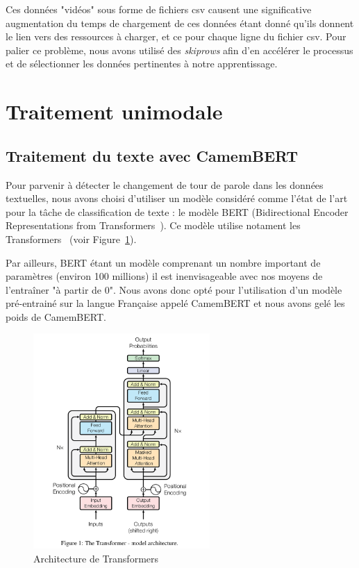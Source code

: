 \documentclass[a4paper]{article}
\begin{document}
Ces données "vidéos" sous forme de fichiers csv causent une significative augmentation du temps de chargement de ces données étant
donné qu'ils donnent le lien vers des ressources à charger, et ce pour chaque ligne du fichier csv. 
Pour palier ce problème, nous avons utilisé des \textit{skiprows} afin d'en accélérer le processus et de sélectionner les données
pertinentes à notre apprentissage.

\section{Traitement unimodale}

\subsection{Traitement du texte avec CamemBERT}

Pour parvenir à détecter le changement de tour de parole dans les données textuelles, nous avons choisi d'utiliser un modèle
considéré comme l'état de l'art pour la tâche de classification de texte : le modèle BERT (Bidirectional Encoder
Representations from Transformers~\cite{Bert}). Ce modèle utilise notament les Transformers~\cite{transformers} (voir Figure~\ref{fig: Transformers}).

Par ailleurs, BERT étant un modèle comprenant un nombre important de paramètres (environ 100 millions) il est inenvisageable avec
nos moyens de l'entraîner "à partir de 0". Nous avons donc opté pour l'utilisation d'un modèle pré-entrainé sur la langue Française
appelé CamemBERT et nous avons gelé les poids de CamemBERT.

\begin{figure}[H]
    \centering
    \includegraphics[width=0.6\textwidth]{model_transformers.png}
    \caption{Architecture de Transformers}
    \label{fig: Transformers} 
\end{figure}
\end{document}
